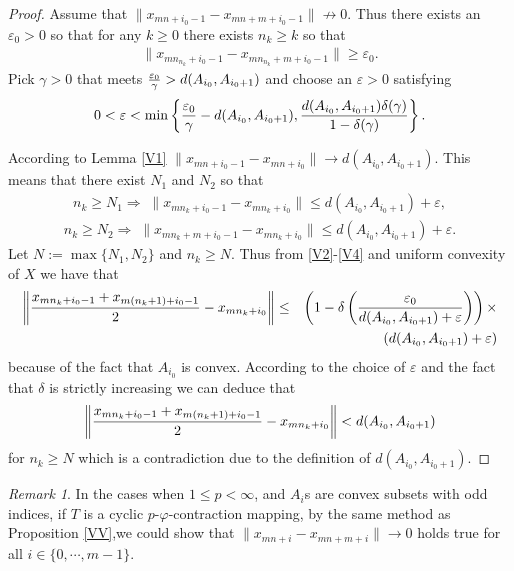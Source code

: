 \documentclass{amsart}
\theoremstyle{definition}
\theoremstyle{remark}
\newtheorem{remark}[theorem]{Remark}
\begin{document}
\begin{proof}
Assume that $\|x_{mn+i_0-1}-x_{mn+m+i_0-1}\|\not\to0$. Thus there exists an $\varepsilon_0>0$ so that for any $k\geq0$ there exists $n_k\geq k$ so that \begin{eqnarray}\label{V2}\|x_{mn_{n_k}+i_0-1}-x_{mn_{n_k}+m+i_0-1}\|\geq\varepsilon_0.\end{eqnarray}Pick $\gamma>0$ that meets ${{\varepsilon_0}\over{\gamma}}>d(A_{i_0},A_{i_0+1})$ and choose an $\varepsilon>0$ satisfying
\begin{eqnarray*}
0<\varepsilon<\min\left\{{{\varepsilon_0}\over{\gamma}}-d(A_{i_0},A_{i_0+1}),{{d(A_{i_0},A_{i_0+1})\delta(\gamma)}\over{1-\delta(\gamma)}}\right\}.
\end{eqnarray*}

According to Lemma \ref{V1} $\|x_{mn+i_0-1}-x_{mn+i_0}\|\to d(A_{i_0},A_{i_0+1})$. This means that there exist $N_1$ and $N_2$ so that
\begin{eqnarray}\label{V3}
n_k\geq N_1\Rightarrow\;\|x_{mn_k+i_0-1}-x_{mn_k+i_0}\|\leq d(A_{i_0},A_{i_0+1})+\varepsilon,
\end{eqnarray}
\begin{eqnarray}\label{V4}
n_k\geq N_2\Rightarrow\;\|x_{mn_k+m+i_0-1}-x_{mn_k+i_0}\|\leq d(A_{i_0},A_{i_0+1})+\varepsilon.
\end{eqnarray}
Let $N:=\max\{N_1,N_2\}$ and $n_k\geq N$. Thus from \eqref{V2}-\eqref{V4} and uniform convexity of $X$ we have that
\begin{eqnarray*}
\left\|{{x_{mn_k+i_0-1}+x_{m(n_k+1)+i_0-1} }\over{2}}-x_{mn_k+i_0}\right\|&\leq&\left(1-\delta\left({{\varepsilon_0}\over{d(A_{i_0},A_{i_0+1})+\varepsilon}}\right)\right)\times\\&&(d(A_{i_0},A_{i_0+1})+\varepsilon)
\end{eqnarray*}
because of the fact that $A_{i_0}$ is convex. According to the choice of $\varepsilon$ and the fact that $\delta$ is strictly increasing we can deduce that
\begin{eqnarray*}
\left\|{{x_{mn_k+i_0-1}+x_{m(n_k+1)+i_0-1} }\over{2}}-x_{mn_k+i_0}\right\|< d(A_{i_0},A_{i_0+1})
\end{eqnarray*} for $n_k\geq N$ which is a contradiction due to the definition of $d(A_{i_0},A_{i_0+1})$.
\end{proof}
\begin{remark}\label{PO1}In the cases when $1\leq p<\infty$,  and $A_i$s are convex subsets with odd indices, if $T$ is a cyclic $p$-$\varphi$-contraction mapping, by the same method as Proposition \ref{VV},we could show that $\|x_{mn+i}-x_{mn+m+i}\|\to0$ holds true for all $i\in\{0,\cdots,m-1\}$.
\end{remark}
\end{document}
